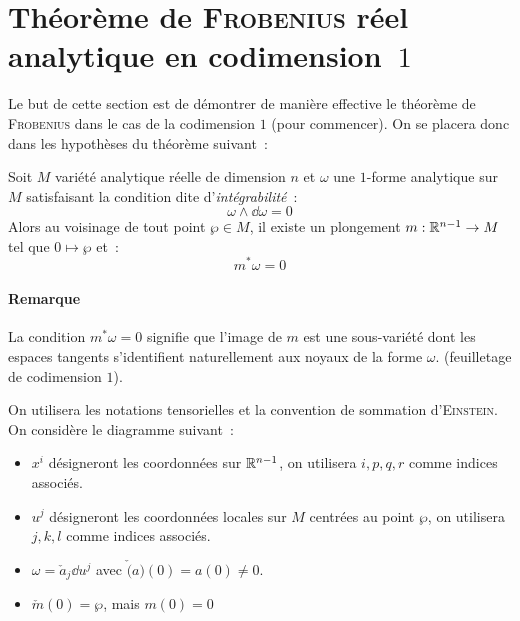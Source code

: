 \documentclass[a4paper,draft]{amsart}
\begin{document}
\tableofcontents

\pagebreak
\section{Théorème de \textsc{Frobenius} réel analytique en codimension~$1$}

Le but de cette section est de démontrer de manière effective le théorème de \textsc{Frobenius} dans le cas de la codimension $1$ (pour commencer). On se placera donc dans les hypothèses du théorème suivant~:
\begin{thm}
Soit $M$ variété analytique réelle de dimension $n$ et $\omega$ une $1$-forme analytique sur $M$ satisfaisant la condition dite d'\textit{intégrabilité}~:
\[
\omega \wedge \dd \omega = 0
\]
Alors au voisinage de tout point $\wp \in M$, il existe un plongement $m : \mathbb{R}^{n-1} \rightarrow M$ tel que $0 \mapsto \wp$ et~:
\[
m^* \omega = 0\]
\end{thm}
\paragraph{Remarque} La condition $m^* \omega = 0$ signifie que l'image de $m$ est une sous-variété dont les espaces tangents s'identifient naturellement aux noyaux de la forme $\omega$. (feuilletage de codimension $1$).

On utilisera les notations tensorielles et la convention de sommation d'\textsc{Einstein}.
On considère le diagramme suivant~:
\begin{center}\end{center}
\begin{itemize}
\item $x^i$ désigneront les coordonnées sur $\mathbb{R}^{n-1}$, on utilisera $i,p,q,r$ comme indices associés.
\item $u^j$ désigneront les coordonnées locales sur $M$ centrées au point $\wp$, on utilisera $j,k,l$ comme indices associés.
\item $\omega = \check{a}_j \dd u^j$ avec $\check(a)(0) = a(0) \neq 0$.
\item $\check{m}(0) = \wp$, mais $m(0) = 0$
\end{itemize}
\end{document}

